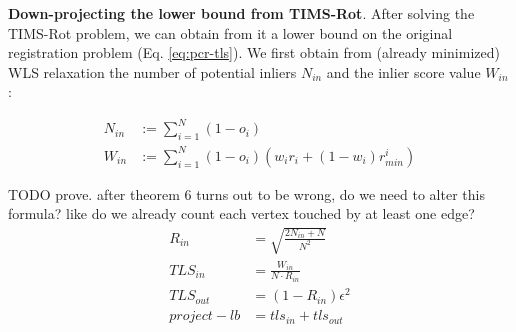 
\textbf{Down-projecting the lower bound from TIMS-Rot}. After solving the TIMS-Rot problem, we can obtain from it a lower bound on the original registration problem (Eq. \ref{eq:pcr-tls}). We first obtain from (already minimized) WLS relaxation the number of potential inliers $N_{in}$ and the inlier score value $W_{in}$:


\begin{equation}
	\label{eq:wls-relax-info}
	\begin{aligned}
		N_{in} &:= \sum_{i=1}^{N} (1 - o_i)\\
		W_{in} &:= \sum_{i=1}^{N} (1 - o_i) \left(w_i r_i  + (1 - w_i) r_{min}^i \right)
	\end{aligned}
\end{equation}

TODO prove. after theorem 6 turns out to be wrong, do we need to alter this formula? like do we already count each vertex touched by at least one edge?\\
\begin{equation}
	\label{eq:lb-downprojection}
	\begin{aligned}
		R_{in} &= \sqrt{\frac{2 N_{in} + N}{N^2}}\\
		TLS_{in} &= \frac{W_{in}}{N \cdot R_{in}}\\
		TLS_{out} &= (1 - R_{in}) \epsilon^2\\
		project-lb  &= tls_{in} + tls_{out}
	\end{aligned}
\end{equation}